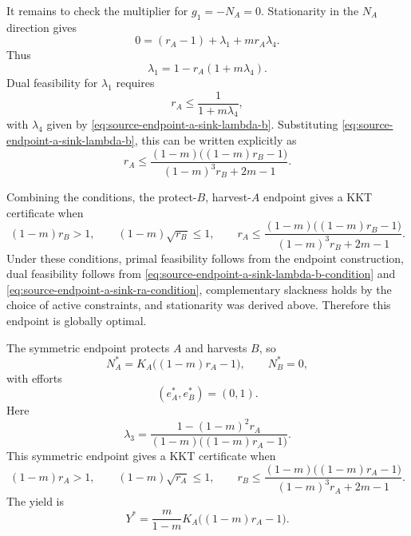 \documentclass{article}
\numberwithin{equation}{section}
\begin{document}
It remains to check the multiplier for $g_1=-N_A=0$. Stationarity in the
$N_A$ direction gives
\begin{equation*}
    0
    =
    (r_A-1)+\lambda_1+m r_A\lambda_4.
\end{equation*}
Thus
\begin{equation}
    \label{eq:source-endpoint-a-sink-lambda-a}
    \lambda_1
    =
    1-r_A(1+m\lambda_4).
\end{equation}
Dual feasibility for $\lambda_1$ requires
\begin{equation}
    \label{eq:source-endpoint-a-sink-ra-condition}
    r_A\leq \frac{1}{1+m\lambda_4},
\end{equation}
with $\lambda_4$ given by
\eqref{eq:source-endpoint-a-sink-lambda-b}.
Substituting \eqref{eq:source-endpoint-a-sink-lambda-b}, this can
be written explicitly as
\begin{equation}
    \label{eq:source-endpoint-a-sink-ra-condition-explicit}
    r_A
    \leq
    \frac{(1-m)\bigl((1-m)r_B-1\bigr)}
         {(1-m)^3r_B+2m-1}.
\end{equation}

Combining the conditions, the protect-$B$, harvest-$A$ endpoint gives a
KKT certificate when
\begin{equation}
    \label{eq:source-endpoint-a-sink-condition}
    (1-m)r_B>1,
    \qquad
    (1-m)\sqrt{r_B}\leq1,
    \qquad
    r_A
    \leq
    \frac{(1-m)\bigl((1-m)r_B-1\bigr)}
         {(1-m)^3r_B+2m-1}.
\end{equation}
Under these conditions, primal feasibility follows from the endpoint
construction, dual feasibility follows from
\eqref{eq:source-endpoint-a-sink-lambda-b-condition} and
\eqref{eq:source-endpoint-a-sink-ra-condition}, complementary
slackness holds by the choice of active constraints, and stationarity was
derived above. Therefore this endpoint is globally optimal.

The symmetric endpoint protects $A$ and harvests $B$, so
\begin{equation}
    \label{eq:source-endpoint-b-sink-population}
    N_A^*=K_A\bigl((1-m)r_A-1\bigr),
    \qquad
    N_B^*=0,
\end{equation}
with efforts
\begin{equation}
    \label{eq:source-endpoint-b-sink-efforts}
    (e_A^*,e_B^*)=(0,1).
\end{equation}
Here
\begin{equation}
    \label{eq:source-endpoint-b-sink-lambda-a}
    \lambda_3
    =
    \frac{1-(1-m)^2r_A}
         {(1-m)\bigl((1-m)r_A-1\bigr)}.
\end{equation}
This symmetric endpoint gives a KKT certificate when
\begin{equation}
    \label{eq:source-endpoint-b-sink-condition}
    (1-m)r_A>1,
    \qquad
    (1-m)\sqrt{r_A}\leq1,
    \qquad
    r_B
    \leq
    \frac{(1-m)\bigl((1-m)r_A-1\bigr)}
         {(1-m)^3r_A+2m-1}.
\end{equation}
The yield is
\begin{equation}
    \label{eq:source-endpoint-b-sink-yield}
    Y^*
    =
    \frac{m}{1-m}
    K_A\bigl((1-m)r_A-1\bigr).
\end{equation}
\end{document}
